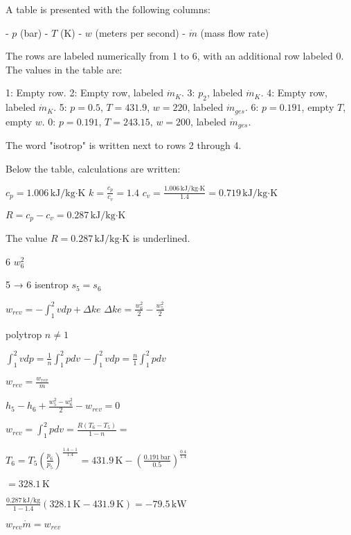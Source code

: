 A table is presented with the following columns:  

- \( p \) (bar)  
- \( T \) (K)  
- \( w \) (meters per second)  
- \( \dot{m} \) (mass flow rate)  

The rows are labeled numerically from 1 to 6, with an additional row labeled 0. The values in the table are:  

1: Empty row.  
2: Empty row, labeled \( \dot{m}_K \).  
3: \( p_2 \), labeled \( \dot{m}_K \).  
4: Empty row, labeled \( \dot{m}_K \).  
5: \( p = 0.5 \), \( T = 431.9 \), \( w = 220 \), labeled \( \dot{m}_{ges} \).  
6: \( p = 0.191 \), empty \( T \), empty \( w \).  
0: \( p = 0.191 \), \( T = 243.15 \), \( w = 200 \), labeled \( \dot{m}_{ges} \).  

The word "isotrop" is written next to rows 2 through 4.  

Below the table, calculations are written:  

\( c_p = 1.006 \, \text{kJ/kg·K} \)  
\( k = \frac{c_p}{c_v} = 1.4 \)  
\( c_v = \frac{1.006 \, \text{kJ/kg·K}}{1.4} = 0.719 \, \text{kJ/kg·K} \)  

\( R = c_p - c_v = 0.287 \, \text{kJ/kg·K} \)  

The value \( R = 0.287 \, \text{kJ/kg·K} \) is underlined.

6 \( w_6^2 \)  

5 → 6 isentrop  
\( s_5 = s_6 \)  

\( w_{rev} = - \int_1^2 v dp + \Delta ke \)  
\( \Delta ke = \frac{w_6^2}{2} - \frac{w_5^2}{2} \)  

polytrop \( n \neq 1 \)  

\( \int_1^2 v dp = \frac{1}{n} \int_1^2 p dv \)  
\( - \int_1^2 v dp = \frac{n}{1} \int_1^2 p dv \)  

\( w_{rev} = \frac{w_{rev}}{\dot{m}} \)  

\( h_5 - h_6 + \frac{w_5^2 - w_6^2}{2} - w_{rev} = 0 \)  

\( w_{rev} = \int_1^2 p dv = \frac{R (T_6 - T_5)}{1 - n} = \)  

\( T_6 = T_5 \left( \frac{p_6}{p_5} \right)^{\frac{1.4 - 1}{1.4}} = 431.9 \, \text{K} - \left( \frac{0.191 \, \text{bar}}{0.5} \right)^{\frac{0.4}{1.4}} \)  

\( = 328.1 \, \text{K} \)  

\( \frac{0.287 \, \text{kJ/kg}}{1 - 1.4} (328.1 \, \text{K} - 431.9 \, \text{K}) = -79.5 \, \text{kW} \)  

\( w_{rev} \dot{m} = w_{rev} \)  

